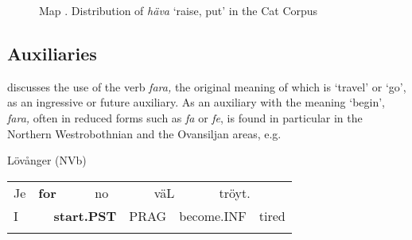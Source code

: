 \begin{figure}[h]

\begin{minipage}{6.7102in}

\begin{stylecaption}
Map . Distribution of \textit{häva} ‘raise, put’ in the Cat Corpus

\end{stylecaption}

\end{minipage}

\end{figure}

\subsection{\rmfamily Auxiliaries}

\begin{styleBodyTextFirst}
\citet{Holm1941} discusses the use of the verb \textit{fara, }the original meaning of which is ‘travel’ or ‘go’, as an ingressive or future auxiliary. As an auxiliary with the meaning ‘begin’, \textit{fara, }often in reduced forms such as \textit{fa} or \textit{fe}, is found in particular in the Northern Westrobothnian and the Ovansiljan areas, e.g. 

\end{styleBodyTextFirst}

\begin{listWWNumileveli}
\item {}

\begin{styleExample}
Lövånger (NVb)

\end{styleExample}

\end{listWWNumileveli}

\begin{tabular}{llllllllll}
\lsptoprule
Je & \multicolumn{2}{l}{{\bfseries for}

} & \multicolumn{2}{l}{no

} & \multicolumn{2}{l}{väL

} & \multicolumn{2}{l}{tröyt.

} & \\
\multicolumn{2}{l}{I

} & \multicolumn{2}{l}{{\bfseries start.PST}

} & \multicolumn{2}{l}{PRAG

} & \multicolumn{2}{l}{become.INF

} & \multicolumn{2}{l}{tired

}\\
\lspbottomrule
\end{tabular}

